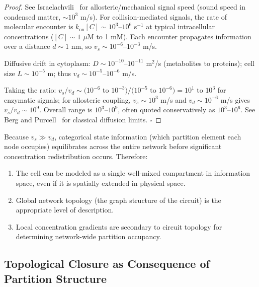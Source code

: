 \begin{proof}
See Israelachvili~\cite{Israelachvili2011} for allosteric/mechanical signal speed (sound speed in condensed matter, $\sim 10^3$ m/s). For collision-mediated signals, the rate of molecular encounter is $k_{\text{on}}[C] \sim 10^3$--$10^6$ s$^{-1}$ at typical intracellular concentrations ($[C] \sim 1$ $\mu$M to 1 mM). Each encounter propagates information over a distance $d \sim 1$ nm, so $v_s \sim 10^{-6}$--$10^{-3}$ m/s.

Diffusive drift in cytoplasm: $D \sim 10^{-10}$--$10^{-11}$ m$^2$/s (metabolites to proteins); cell size $L \sim 10^{-5}$ m; thus $v_d \sim 10^{-5}$--$10^{-6}$ m/s.

Taking the ratio: $v_s/v_d \sim (10^{-6}$ to $10^{-3}) / (10^{-5}$ to $10^{-6}) = 10^1$ to $10^3$ for enzymatic signals; for allosteric coupling, $v_s \sim 10^3$ m/s and $v_d \sim 10^{-6}$ m/s gives $v_s/v_d \sim 10^9$. Overall range is $10^3$--$10^9$, often quoted conservatively as $10^3$--$10^6$. See Berg and Purcell~\cite{BergPurcell1977} for classical diffusion limits. $\square$
\end{proof}

\begin{corollary}
\label{cor:global-circuit}
Because $v_s \gg v_d$, categorical state information (which partition element each node occupies) equilibrates across the entire network before significant concentration redistribution occurs. Therefore:
\begin{enumerate}[label=(\roman*), noitemsep]
\item The cell can be modeled as a single well-mixed compartment in information space, even if it is spatially extended in physical space.
\item Global network topology (the graph structure of the circuit) is the appropriate level of description.
\item Local concentration gradients are secondary to circuit topology for determining network-wide partition occupancy.
\end{enumerate}
\end{corollary}

\subsection{Topological Closure as Consequence of Partition Structure}
\label{subsec:closure-requirement}

